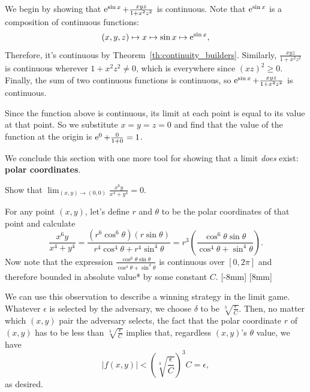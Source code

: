\documentclass{watsonbook}
\begin{document}
\begin{solution}
  We begin by showing that $\operatorname{e}^{\sin x} + \frac{xyz}{1 + x^2 z^2}$ is
  continuous.  Note that $\operatorname{e}^{\sin x}$ is a composition of continuous
  functions: 
  \[
    (x,y,z) \mapsto x \mapsto \sin x \mapsto \operatorname{e}^{\sin x}, 
  \]
  Therefore, it's continuous by Theorem~\ref{th:continuity_builders}. Similarly,
  $\frac{xyz}{1 + x^2 z^2}$ is continuous wherever $1 + x^2 z^2 \neq
  0$, which is everywhere since $(xz)^2 \geq 0$. Finally, the sum of
  two continuous functions is continuous, so $\operatorname{e}^{\sin x} +
  \frac{xyz}{1 + x^2 z^2}$ is continuous.

  Since the function above is continuous, its limit at each point is
  equal to its value at that point. So we substitute $x=y=z=0$ and
  find that the value of the function at the origin is
  $\operatorname{e}^0 + \frac{0}{1+0} = 1$.
\end{solution}

We conclude this section with one more tool for showing that a limit
\textit{does} exist: \textbf{polar coordinates}.

\begin{example}{}{}
  Show that $\displaystyle{\lim_{(x,y) \to (0,0)}\frac{x^6 y}{x^4 + y^4} = 0}$. 
\end{example}

\begin{solution}
  For any point $(x,y)$, let's define $r$ and $\theta$ to be the polar
  coordinates of that point and calculate
  \[
    \frac{x^6 y}{x^4 + y^4} = \frac{(r^6 \cos^6 \theta) (r\sin \theta)}{r^4
      \cos^4 \theta + r^4\sin^4 \theta} = r^3 \left(\frac{\cos^6\theta \sin
        \theta}{ \cos^4 \theta + \sin^4\theta}\right). 
  \]
  Now note that the expression
  $\frac{\cos^6\theta \sin \theta}{ \cos^4 \theta + \sin^4\theta}$ is
  continuous over $[0,2\pi]$ and therefore bounded in absolute value*
  by some constant $C$. [-8mm]
  [8mm]

  We can use this observation to describe a winning strategy in the
  limit game. Whatever $\epsilon$ is selected by the adversary, we
  choose $\delta$ to be $\sqrt[3]{\frac{\epsilon}{C}}$. Then, 
  no matter which $(x,y)$ pair the adversary selects, the fact that
  the polar coordinate $r$ of $(x,y)$ has to be less than
  $\sqrt[3]{\frac{\epsilon}{C}}$ implies that, regardless $(x,y)$'s
  $\theta$ value, we have 
  \[
    |f(x,y)| <  \left(\sqrt[3]{\frac{\epsilon}{C}}\right)^3 C =
    \epsilon, 
  \]
  as desired. 
\end{solution}
\end{document}
